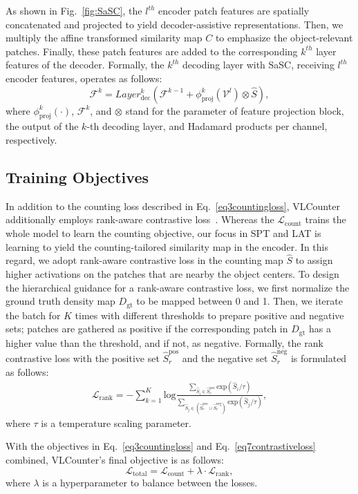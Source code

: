 As shown in Fig.~\ref{fig:SaSC}, the $l^{th}$ encoder patch features are spatially concatenated and projected to yield decoder-assistive representations.
Then, we multiply the affine transformed similarity map $C$ to emphasize the object-relevant patches.
Finally, these patch features are added to the corresponding $k^{th}$ layer features of the decoder.
Formally, the $k^{th}$ decoding layer with SaSC, receiving $l^{th}$ encoder features, operates as follows:
\begin{equation}
    \mathcal{F}^{k} = Layer^{k}_\text{dec}(\mathcal{F}^{k-1} + \phi_\text{proj}^{k}(\mathcal{V}^{l}) \otimes \hat{S}),
\end{equation}
where $\phi_\text{proj}^{k}(\cdot)$, $\mathcal{F}^{k}$, and $\otimes$ stand for the parameter of feature projection block, the output of the $k$-th decoding layer, and Hadamard products per channel, respectively.


\subsection{Training Objectives}
\label{Method:Loss}
In addition to the counting loss described in Eq.~\ref{eq3countingloss}, VLCounter additionally employs rank-aware contrastive loss~\cite{hoffmann2022ranking, moon2023query}.
Whereas the $\mathcal{L}_{\text{count}}$ trains the whole model to learn the counting objective, 
our focus in SPT and LAT is learning to yield the counting-tailored similarity map in the encoder.
In this regard, we adopt rank-aware contrastive loss in the counting map $\hat{S}$ to assign higher activations on the patches that are nearby the object centers.
To design the hierarchical guidance for a rank-aware contrastive loss, we first normalize the ground truth density map $D_{\text{gt}}$ to be mapped between 0 and 1.
Then, we iterate the batch for $K$ times with different thresholds to prepare positive and negative sets; patches are gathered as positive if the corresponding patch in $D_\text{gt}$ has a higher value than the threshold, and if not, as negative.
Formally, the rank contrastive loss with the positive set $\hat{S}_r^\text{pos}$ and the negative set $\hat{S}_r^\text{neg}$ is formulated as follows:
\begin{eqnarray}
    \label{eq7contrastiveloss}
    \mathcal{L}_{\text{rank}}=-\sum_{k=1}^{K}\text{log}\frac{
    \sum_{\hat{S}_i\in \hat{S}_r^\text{pos}}\text{exp}(\hat{S}_i/\tau)}
    {
    \sum_{\hat{S}_j\in (\hat{S}_r^\text{pos} \cup \hat{S}_r^\text{neg})}\text{exp}(\hat{S}_j/\tau)
    },
\end{eqnarray}
where $\tau$ is a temperature scaling parameter.


With the objectives in Eq.~\ref{eq3countingloss} and Eq.~\ref{eq7contrastiveloss} combined, VLCounter's final objective is as follows:
\begin{equation}
    \mathcal{L}_{\text{total}} = \mathcal{L}_{\text{count}} + \lambda \cdot \mathcal{L}_{\text{rank}},
\end{equation}
where $\lambda$ is a hyperparameter to balance between the losses.